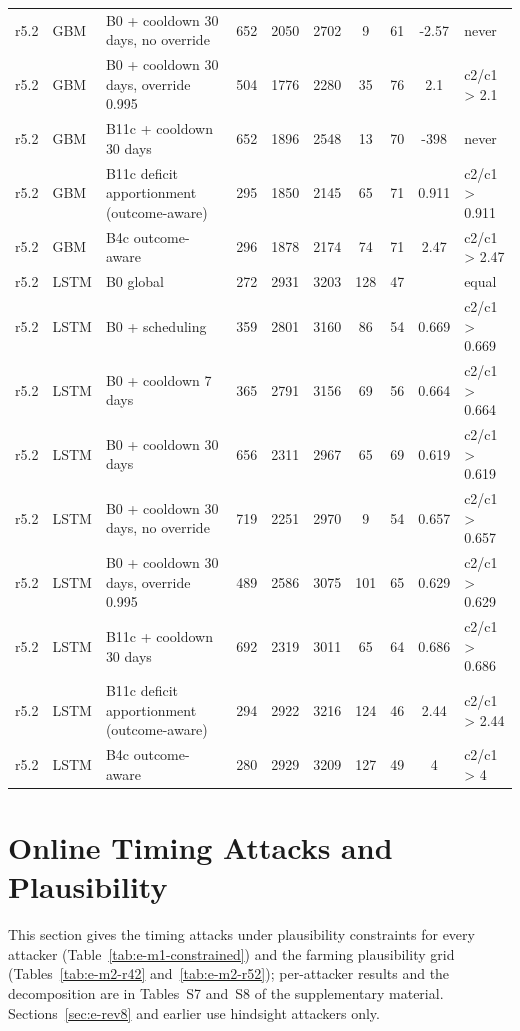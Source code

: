 \documentclass[10pt,onecolumn,letterpaper]{article}
\begin{document}
\begin{longtable}{llp{4.6cm}ccccccl}
r5.2 & GBM & B0 + cooldown 30 days, no override & 652 & 2050 & 2702 & 9 & 61 & -2.57 & never \\
r5.2 & GBM & B0 + cooldown 30 days, override 0.995 & 504 & 1776 & 2280 & 35 & 76 & 2.1 & c2/c1 > 2.1 \\
r5.2 & GBM & B11c + cooldown 30 days & 652 & 1896 & 2548 & 13 & 70 & -398 & never \\
r5.2 & GBM & B11c deficit apportionment (outcome-aware) & 295 & 1850 & 2145 & 65 & 71 & 0.911 & c2/c1 > 0.911 \\
r5.2 & GBM & B4c outcome-aware & 296 & 1878 & 2174 & 74 & 71 & 2.47 & c2/c1 > 2.47 \\
r5.2 & LSTM & B0 global & 272 & 2931 & 3203 & 128 & 47 &  & equal \\
r5.2 & LSTM & B0 + scheduling & 359 & 2801 & 3160 & 86 & 54 & 0.669 & c2/c1 > 0.669 \\
r5.2 & LSTM & B0 + cooldown 7 days & 365 & 2791 & 3156 & 69 & 56 & 0.664 & c2/c1 > 0.664 \\
r5.2 & LSTM & B0 + cooldown 30 days & 656 & 2311 & 2967 & 65 & 69 & 0.619 & c2/c1 > 0.619 \\
r5.2 & LSTM & B0 + cooldown 30 days, no override & 719 & 2251 & 2970 & 9 & 54 & 0.657 & c2/c1 > 0.657 \\
r5.2 & LSTM & B0 + cooldown 30 days, override 0.995 & 489 & 2586 & 3075 & 101 & 65 & 0.629 & c2/c1 > 0.629 \\
r5.2 & LSTM & B11c + cooldown 30 days & 692 & 2319 & 3011 & 65 & 64 & 0.686 & c2/c1 > 0.686 \\
r5.2 & LSTM & B11c deficit apportionment (outcome-aware) & 294 & 2922 & 3216 & 124 & 46 & 2.44 & c2/c1 > 2.44 \\
r5.2 & LSTM & B4c outcome-aware & 280 & 2929 & 3209 & 127 & 49 & 4 & c2/c1 > 4 \\
\bottomrule
\end{longtable}

\section{Online Timing Attacks and Plausibility}
\label{sec:e-rev9}
This section gives the timing attacks under plausibility constraints for every attacker (Table~\ref{tab:e-m1-constrained}) and the farming plausibility grid (Tables~\ref{tab:e-m2-r42} and~\ref{tab:e-m2-r52}); per-attacker results and the decomposition are in Tables~S7 and~S8 of the supplementary material. Sections~\ref{sec:e-rev8} and earlier use hindsight attackers only.
\end{document}
